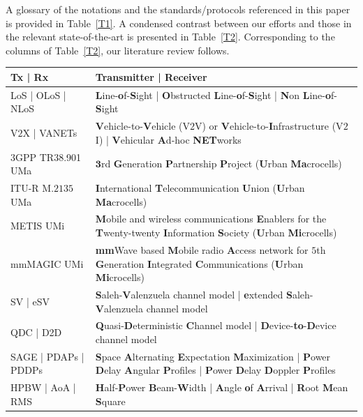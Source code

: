 \documentclass[12pt, draftcls, onecolumn]{IEEEtran}
\begin{document}
A glossary of the notations and the standards/protocols referenced in this paper is provided in Table~\ref{T1}. A condensed contrast between our efforts and those in the relevant state-of-the-art is presented in Table~\ref{T2}. Corresponding to the columns of Table~\ref{T2}, our literature review follows.
\begin{table} [tb]
	\centering
	\scriptsize
	\begin{tabular}{|l||l|}
		\hline
        Tx | Rx & Transmitter | Receiver\\
        \hline
        LoS | OLoS | NLoS & \textbf{L}ine-\textbf{o}f-\textbf{S}ight | \textbf{O}bstructed \textbf{L}ine-\textbf{o}f-\textbf{S}ight | \textbf{N}on \textbf{L}ine-\textbf{o}f-\textbf{S}ight\\
        \hline
		V$2$X | VANETs & \textbf{V}ehicle-to-\textbf{V}ehicle (V$2$V) or \textbf{V}ehicle-to-\textbf{I}nfrastructure (V$2$I) | \textbf{V}ehicular \textbf{A}d-hoc \textbf{NET}works\\
		\hline
		$3$GPP TR38.901 UMa & $\mathbf{3}$rd \textbf{G}eneration \textbf{P}artnership \textbf{P}roject (\textbf{U}rban \textbf{Ma}crocells)\\
		\hline
		ITU-R M$.2135$ UMa & \textbf{I}nternational \textbf{T}elecommunication \textbf{U}nion (\textbf{U}rban \textbf{Ma}crocells)\\
		\hline
        METIS UMi & \textbf{M}obile and wireless communications \textbf{E}nablers for the \textbf{T}wenty-twenty \textbf{I}nformation \textbf{S}ociety (\textbf{U}rban \textbf{Mi}crocells)\\
        \hline
        mmMAGIC UMi & \textbf{mm}Wave based \textbf{M}obile radio \textbf{A}ccess network for $5$th \textbf{G}eneration \textbf{I}ntegrated \textbf{C}ommunications (\textbf{U}rban \textbf{Mi}crocells)\\
        \hline
        SV | eSV & \textbf{S}aleh-\textbf{V}alenzuela channel model | \textbf{e}xtended \textbf{S}aleh-\textbf{V}alenzuela channel model\\
        \hline
        QDC | D2D  & \textbf{Q}uasi-\textbf{D}eterministic \textbf{C}hannel model | \textbf{D}evice-\textbf{to}-\textbf{D}evice channel model\\
        \hline
		SAGE | PDAPs | PDDPs & \textbf{S}pace \textbf{A}lternating \textbf{E}xpectation \textbf{M}aximization | \textbf{P}ower \textbf{D}elay \textbf{A}ngular \textbf{P}rofiles | \textbf{P}ower \textbf{D}elay \textbf{D}oppler \textbf{P}rofiles\\
		\hline
		HPBW | AoA | RMS & \textbf{H}alf-\textbf{P}ower \textbf{B}eam-\textbf{W}idth | \textbf{A}ngle \textbf{o}f \textbf{A}rrival | \textbf{R}oot \textbf{M}ean \textbf{S}quare\\

\end{tabular}
\end{table}
\end{document}
